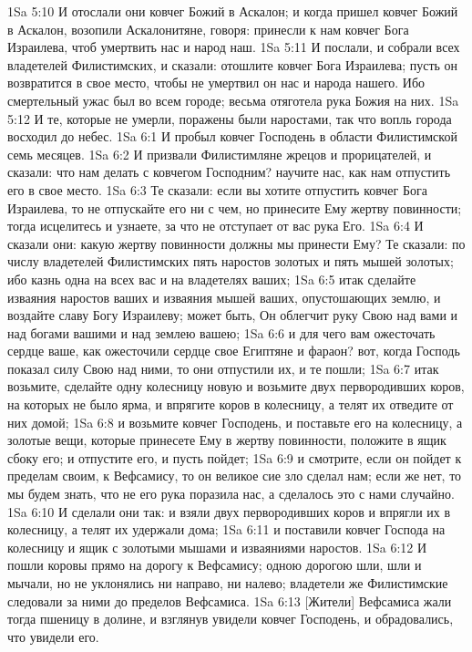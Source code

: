1Sa 5:10  И отослали они ковчег Божий в Аскалон; и когда пришел ковчег Божий в Аскалон, возопили Аскалонитяне, говоря: принесли к нам ковчег Бога Израилева, чтоб умертвить нас и народ наш.
1Sa 5:11  И послали, и собрали всех владетелей Филистимских, и сказали: отошлите ковчег Бога Израилева; пусть он возвратится в свое место, чтобы не умертвил он нас и народа нашего. Ибо смертельный ужас был во всем городе; весьма отяготела рука Божия на них.
1Sa 5:12  И те, которые не умерли, поражены были наростами, так что вопль города восходил до небес.
1Sa 6:1  И пробыл ковчег Господень в области Филистимской семь месяцев.
1Sa 6:2  И призвали Филистимляне жрецов и прорицателей, и сказали: что нам делать с ковчегом Господним? научите нас, как нам отпустить его в свое место.
1Sa 6:3  Те сказали: если вы хотите отпустить ковчег Бога Израилева, то не отпускайте его ни с чем, но принесите Ему жертву повинности; тогда исцелитесь и узнаете, за что не отступает от вас рука Его.
1Sa 6:4  И сказали они: какую жертву повинности должны мы принести Ему? Те сказали: по числу владетелей Филистимских пять наростов золотых и пять мышей золотых; ибо казнь одна на всех вас и на владетелях ваших;
1Sa 6:5  итак сделайте изваяния наростов ваших и изваяния мышей ваших, опустошающих землю, и воздайте славу Богу Израилеву; может быть, Он облегчит руку Свою над вами и над богами вашими и над землею вашею;
1Sa 6:6  и для чего вам ожесточать сердце ваше, как ожесточили сердце свое Египтяне и фараон? вот, когда Господь показал силу Свою над ними, то они отпустили их, и те пошли;
1Sa 6:7  итак возьмите, сделайте одну колесницу новую и возьмите двух первородивших коров, на которых не было ярма, и впрягите коров в колесницу, а телят их отведите от них домой;
1Sa 6:8  и возьмите ковчег Господень, и поставьте его на колесницу, а золотые вещи, которые принесете Ему в жертву повинности, положите в ящик сбоку его; и отпустите его, и пусть пойдет;
1Sa 6:9  и смотрите, если он пойдет к пределам своим, к Вефсамису, то он великое сие зло сделал нам; если же нет, то мы будем знать, что не его рука поразила нас, а сделалось это с нами случайно.
1Sa 6:10  И сделали они так: и взяли двух первородивших коров и впрягли их в колесницу, а телят их удержали дома;
1Sa 6:11  и поставили ковчег Господа на колесницу и ящик с золотыми мышами и изваяниями наростов.
1Sa 6:12  И пошли коровы прямо на дорогу к Вефсамису; одною дорогою шли, шли и мычали, но не уклонялись ни направо, ни налево; владетели же Филистимские следовали за ними до пределов Вефсамиса.
1Sa 6:13  [Жители] Вефсамиса жали тогда пшеницу в долине, и взглянув увидели ковчег Господень, и обрадовались, что увидели его.
